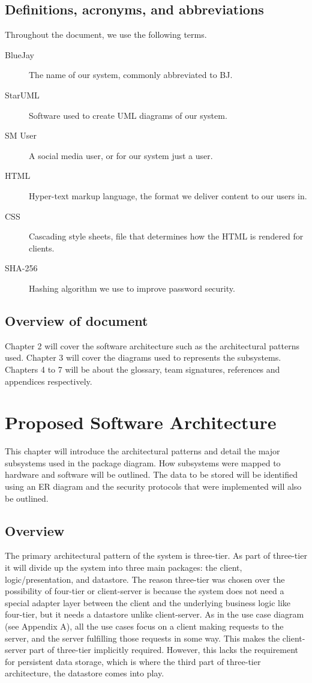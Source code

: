 \documentclass{report}
\begin{document}
\section{Definitions, acronyms, and abbreviations}
	Throughout the document, we use the following terms.
	\begin{description}
		\item [BlueJay] The name of our system, commonly abbreviated to BJ.
		\item [StarUML] Software used to create UML diagrams of our system.
		\item [SM User] A social media user, or for our system just a user.
		\item [HTML] Hyper-text markup language, the format we deliver content to our users in.
		\item [CSS] Cascading style sheets, file that determines how the HTML is rendered for clients.
		\item [SHA-256] Hashing algorithm we use to improve password security.
	\end{description}
\section{Overview of document}
	Chapter 2 will cover the software architecture such as the architectural patterns used.
	Chapter 3 will cover the diagrams used to represents the subsystems.
	Chapters 4 to 7 will be about the glossary, team signatures, references and appendices respectively.

\chapter{Proposed Software Architecture}
This chapter will introduce the architectural patterns and detail the major subsystems used in the package diagram. How subsystems were mapped to hardware and software will be outlined. The data to be stored will be identified using an ER diagram and the security protocols that were implemented will also be outlined.
\section{Overview}
The primary architectural pattern of the system is three-tier. As part of three-tier it will divide up the system into three main packages: the client, logic/presentation, and datastore. The reason three-tier was chosen over the possibility of four-tier or client-server is because the system does not need a special adapter layer between the client and the underlying business logic like four-tier, but it needs a datastore unlike client-server. As in the use case diagram (see Appendix A), all the use cases focus on a client making requests to the server, and the server fulfilling those requests in some way. This makes the client-server part of three-tier implicitly required. However, this lacks the requirement for persistent data storage, which is where the third part of three-tier architecture, the datastore comes into play.
\end{document}
